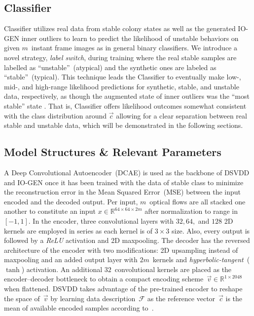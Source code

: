 \documentclass[letterpaper]{article} %
\begin{document}
\subsection{Classifier}
\label{sec:classifier}

Classifier utilizes real data from stable colony states as well as the
generated \mbox{IO-GEN} inner outliers to learn to predict the likelihood of
unstable behaviors on given $m$~instant frame images as in general
binary classifiers. We introduce a novel strategy, \emph{label switch}, during
training where the real stable samples are labelled as
``unstable''~(atypical) and the synthetic ones are labeled as
``stable''~(typical). This technique leads the Classifier to eventually
make \mbox{low-,} \mbox{mid-,} and high-range likelihood predictions for synthetic,
stable, and unstable data, respectively, as though the augmented state
of inner outliers was the ``most stable'' state . That is, Classifier
offers likelihood outcomes somewhat consistent with the class
distribution around $\vec{c}$ allowing for a clear separation between
real stable and unstable data, which will be demonstrated in
the following sections.

\subsection{Model Structures \& Relevant Parameters}
\label{sec:model_structures}

A Deep Convolutional Autoencoder~(DCAE) is used as the backbone of DSVDD
and \mbox{IO-GEN} once it has been trained with the data of stable class to
minimize the reconstruction error in the Mean Squared Error~(MSE)
between the input encoded and the decoded output. Per input, 
$m$~optical flows are all stacked one another to constitute an
input $x \in \mathbb{R}^{64 \times 64 \times 2m}$ after normalization to
range in $[-1, 1]$. In the encoder, three convolutional layers with $32,
64,$ and $128$ 2D kernels are employed in series as each kernel is of $3
\times 3$ size. Also, every output is followed by a \emph{ReLU}
activation and 2D maxpooling. The decoder has the reversed architecture
of the encoder with two modifications: 2D upsampling instead of
maxpooling and an added output layer with $2m$~kernels and
\emph{hyperbolic-tangent}~($\tanh$) activation.
An additional $32$~convolutional kernels are placed as the
encoder--decoder bottleneck to obtain a compact
encoding scheme~$\vec{v} \in \mathbb{R}^{1 \times 2048}$ when flattened.
DSVDD takes advantage of the pre-trained encoder to reshape the space
of~$\vec{v}$ by learning data description~$\mathcal{F}$ as the reference
vector~$\vec{c}$ is the mean of available encoded
samples according to~\citet{RVGDSBMK18}.
\end{document}
